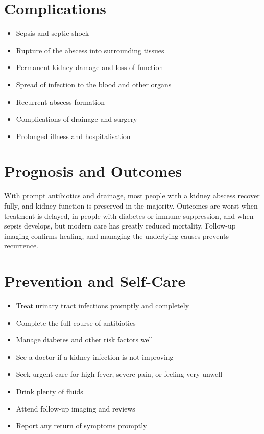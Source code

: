 \section*{Complications}
\begin{itemize}
    \item Sepsis and septic shock
    \item Rupture of the abscess into surrounding tissues
    \item Permanent kidney damage and loss of function
    \item Spread of infection to the blood and other organs
    \item Recurrent abscess formation
    \item Complications of drainage and surgery
    \item Prolonged illness and hospitalisation
\end{itemize}

\section*{Prognosis and Outcomes}
With prompt antibiotics and drainage, most people with a kidney abscess recover fully, and kidney function is preserved in the majority. Outcomes are worst when treatment is delayed, in people with diabetes or immune suppression, and when sepsis develops, but modern care has greatly reduced mortality. Follow-up imaging confirms healing, and managing the underlying causes prevents recurrence.

\section*{Prevention and Self-Care}
\begin{itemize}
    \item Treat urinary tract infections promptly and completely
    \item Complete the full course of antibiotics
    \item Manage diabetes and other risk factors well
    \item See a doctor if a kidney infection is not improving
    \item Seek urgent care for high fever, severe pain, or feeling very unwell
    \item Drink plenty of fluids
    \item Attend follow-up imaging and reviews
    \item Report any return of symptoms promptly
\end{itemize}

